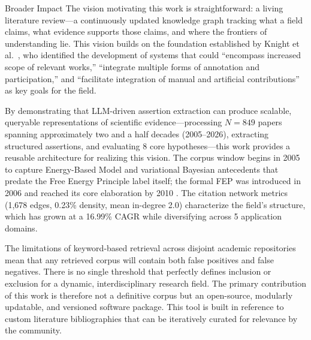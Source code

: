 \documentclass[
  ignorenonframetext,
]{beamer}
\begin{document}
\begin{frame}{Broader Impact}
\protect{}\label{broader-impact}
The vision motivating this work is straightforward: a living literature
review---a continuously updated knowledge graph tracking what a field
claims, what evidence supports those claims, and where the frontiers of
understanding lie. This vision builds on the foundation established by
Knight et al.~\citep{knight2022fep}, who identified the development of
systems that could ``encompass increased scope of relevant works,''
``integrate multiple forms of annotation and participation,'' and
``facilitate integration of manual and artificial contributions'' as key
goals for the field.

By demonstrating that LLM-driven assertion extraction can produce
scalable, queryable representations of scientific evidence---processing
\(N = 849\) papers spanning approximately two and a half decades
(2005--2026), extracting structured assertions, and evaluating 8 core
hypotheses---this work provides a reusable architecture for realizing
this vision. The corpus window begins in 2005 to capture Energy-Based
Model and variational Bayesian antecedents that predate the Free Energy
Principle label itself; the formal FEP was introduced in 2006
\citep{friston2006free} and reached its core elaboration by 2010
\citep{friston2010free}. The citation network metrics (1,678 edges,
0.23\% density, mean in-degree 2.0) characterize the field's structure,
which has grown at a 16.99\% CAGR while diversifying across 5
application domains.

The limitations of keyword-based retrieval across disjoint academic
repositories mean that any retrieved corpus will contain both false
positives and false negatives. There is no single threshold that
perfectly defines inclusion or exclusion for a dynamic,
interdisciplinary research field. The primary contribution of this work
is therefore not a definitive corpus but an open-source, modularly
updatable, and versioned software package. This tool is built in
reference to custom literature bibliographies that can be iteratively
curated for relevance by the community.


\end{frame}
\end{document}
